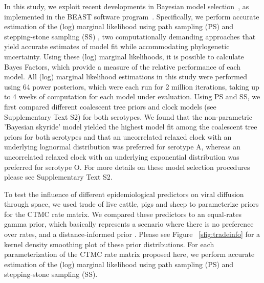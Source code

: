 \documentclass[10pt]{article}
\begin{document}
In this study, we exploit recent developments in Bayesian model selection~\cite{Baele2012,Baele2013a,Baele2013b}, as implemented in the BEAST software program~\cite{beast2012}.%
Specifically, we perform accurate estimation of the (log) marginal likelihood using path sampling (PS) \cite{LartillotPhilippe} and stepping-stone sampling (SS) \cite{Xie}, two computationally demanding approaches that yield accurate estimates of model fit while accommodating phylogenetic uncertainty.
Using these (log) marginal likelihoods, it is possible to calculate Bayes Factors, which provide a measure of the relative performance of each model. 
All (log) marginal likelihood estimations in this study were performed using 64 power posteriors, which were each run for 2 million iterations, taking up to 4 weeks of computation for each model under evaluation. %
Using PS and SS, we first compared different coalescent tree priors and clock models (see Supplementary Text S2) for both serotypes. 
We found that the non-parametric 'Bayesian skyride' model yielded the highest model fit among the coalescent tree priors for both serotypes and that an uncorrelated relaxed clock with an underlying lognormal distribution was preferred for serotype A, whereas an uncorrelated relaxed clock with an underlying exponential distribution was preferred for serotype O.
For more details on these model selection procedures please see Supplementary Text S2.

To test the influence of different epidemiological predictors on viral diffusion through space, we used trade of live cattle, pigs and sheep to parameterize priors for the CTMC rate matrix.
We compared these predictors to an equal-rates gamma prior, which basically represents a scenario where there is no preference over rates, and a distance-informed prior \cite{roots}.
Please see Figure ~\ref{sfig:tradeinfo} for a kernel density smoothing plot of these prior distributions.
For each parameterization of the CTMC rate matrix proposed here, we perform accurate estimation of the (log) marginal likelihood using path sampling (PS) and stepping-stone sampling (SS).
\end{document}
